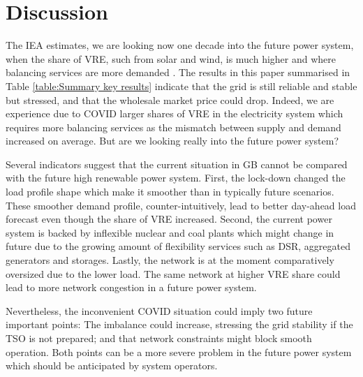 \documentclass[energies,article,submit,moreauthors,pdftex]{Definitions/mdpi}
\begin{document}

\section{Discussion}

The IEA estimates, we are looking now one decade into the future power system, when the share of VRE, such from solar and wind, is much higher and where balancing services are more demanded \cite{IgorTodorovic2020Birol:Balance}. The results in this paper summarised in Table \ref{table:Summary key results} indicate that the grid is still reliable and stable but stressed, and that the wholesale market price could drop. Indeed, we are experience due to COVID larger shares of VRE in the electricity system which requires more balancing services as the mismatch between supply and demand increased on average. But are we looking really into the future power system? 

Several indicators suggest that the current situation in GB cannot be compared with the future high renewable power system. First, the lock-down changed the load profile shape which make it smoother than in typically future scenarios. These smoother demand profile, counter-intuitively, lead to better day-ahead load forecast even though the share of VRE increased. Second, the current power system is backed by inflexible nuclear and coal plants which might change in future due to the growing amount of flexibility services such as DSR, aggregated generators and storages. Lastly, the network is at the moment comparatively oversized due to the lower load. The same network at higher VRE share could lead to more network congestion in a future power system.

Nevertheless, the inconvenient COVID situation could imply two future important points: The imbalance could increase, stressing the grid stability if the TSO is not prepared; and that network constraints might block smooth operation. Both points can be a more severe problem in the future power system which should be anticipated by system operators. 
 
\end{document}
